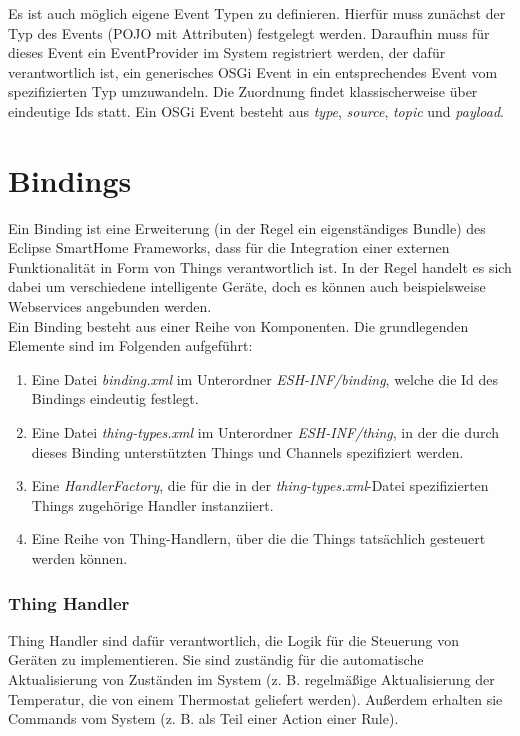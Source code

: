 Es ist auch möglich eigene Event Typen zu definieren. Hierfür muss zunächst der Typ des Events (POJO mit Attributen) festgelegt werden. Daraufhin muss für dieses Event ein EventProvider im System registriert werden, der dafür verantwortlich ist, ein generisches OSGi Event in ein entsprechendes Event vom spezifizierten Typ umzuwandeln. Die Zuordnung findet klassischerweise über eindeutige Ids statt. Ein OSGi Event besteht aus \textit{type}, \textit{source}, \textit{topic} und \textit{payload}.


\section{Bindings}
\label{esh:bindings}
Ein Binding ist eine Erweiterung (in der Regel ein eigenständiges Bundle) des Eclipse SmartHome Frameworks, dass für die Integration einer externen Funktionalität in Form von Things verantwortlich ist. 
In der Regel handelt es sich dabei um verschiedene intelligente Geräte, doch es können auch beispielsweise Webservices angebunden werden.\\

Ein Binding besteht aus einer Reihe von Komponenten. Die grundlegenden Elemente sind im Folgenden aufgeführt:

\begin{enumerate}
\item Eine Datei \textit{binding.xml} im Unterordner \textit{ESH-INF/binding}, welche die Id des Bindings eindeutig festlegt.
\item Eine Datei \textit{thing-types.xml} im Unterordner \textit{ESH-INF/thing}, in der die durch dieses Binding unterstützten Things und Channels spezifiziert werden.
\item Eine \textit{HandlerFactory}, die für die in der \textit{thing-types.xml}-Datei spezifizierten Things zugehörige Handler instanziiert.
\item Eine Reihe von Thing-Handlern, über die die Things tatsächlich gesteuert werden können.
\end{enumerate}


\subsubsection{Thing Handler}
Thing Handler sind dafür verantwortlich, die Logik für die Steuerung von Geräten zu implementieren. Sie sind zuständig für die automatische Aktualisierung von Zuständen im System (z. B. regelmäßige Aktualisierung der Temperatur, die von einem Thermostat geliefert werden). Außerdem erhalten sie Commands vom System (z. B. als Teil einer Action einer Rule).








